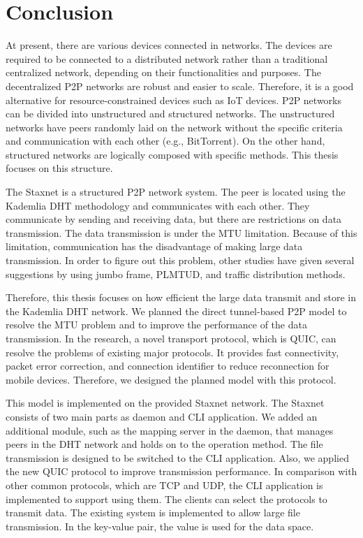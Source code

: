 \chapter{Conclusion}
\label{cha:conclusion}

At present, there are various devices connected in networks. The devices are required to be connected to a distributed network rather than a traditional centralized network, depending on their functionalities and purposes. The decentralized P2P networks are robust and easier to scale. Therefore, it is a good alternative for resource-constrained devices such as IoT devices. P2P networks can be divided into unstructured and structured networks. The unstructured networks have peers randomly laid on the network without the specific criteria and communication with each other (e.g., BitTorrent). On the other hand, structured networks are logically composed with specific methods. This thesis focuses on this structure.

The Staxnet is a structured P2P network system. The peer is located using the Kademlia DHT methodology and communicates with each other. They communicate by sending and receiving data, but there are restrictions on data transmission. The data transmission is under the MTU limitation. Because of this limitation, communication has the disadvantage of making large data transmission. In order to figure out this problem, other studies have given several suggestions by using jumbo frame, PLMTUD, and traffic distribution methods. 

Therefore, this thesis focuses on how efficient the large data transmit and store in the Kademlia DHT network. We planned the direct tunnel-based P2P model to resolve the MTU problem and to improve the performance of the data transmission. In the research, a novel transport protocol, which is QUIC, can resolve the problems of existing major protocols. It provides fast connectivity, packet error correction, and connection identifier to reduce reconnection for mobile devices. Therefore, we designed the planned model with this protocol.

This model is implemented on the provided Staxnet network. The Staxnet consists of two main parts as daemon and CLI application. We added an additional module, such as the mapping server in the daemon, that manages peers in the DHT network and holds on to the operation method. The file transmission is designed to be switched to the CLI application. Also, we applied the new QUIC protocol to improve transmission performance. In comparison with other common protocols, which are TCP and UDP, the CLI application is implemented to support using them. The clients can select the protocols to transmit data. The existing system is implemented to allow large file transmission. In the key-value pair, the value is used for the data space.


